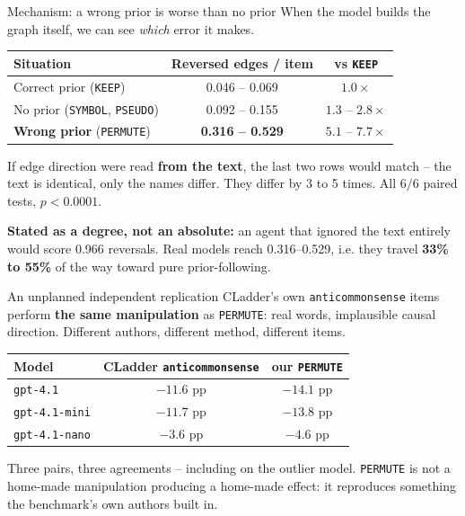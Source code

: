 \documentclass{beamer}
\begin{document}
\begin{frame}{Mechanism: a wrong prior is worse than no prior}
  When the model builds the graph itself, we can see \emph{which} error it makes.

  \begin{center}
  \small
  \begin{tabular}{lcc}
    \toprule
    Situation & Reversed edges / item & vs \texttt{KEEP} \\
    \midrule
    Correct prior (\texttt{KEEP})        & 0.046 -- 0.069 & $1.0\times$ \\
    No prior (\texttt{SYMBOL}, \texttt{PSEUDO}) & 0.092 -- 0.155 & $1.3$ -- $2.8\times$ \\
    \textbf{Wrong prior} (\texttt{PERMUTE}) & \textbf{0.316 -- 0.529} & $\mathbf{5.1}$ -- $\mathbf{7.7\times}$ \\
    \bottomrule
  \end{tabular}
  \end{center}

  \vspace{0.2cm}
  If edge direction were read \textbf{from the text}, the last two rows would
  match -- the text is identical, only the names differ. They differ by
  3 to 5 times. All $6/6$ paired tests, $p < 0.0001$.

  \vspace{0.2cm}
  \textbf{Stated as a degree, not an absolute:} an agent that ignored the text
  entirely would score 0.966 reversals. Real models reach 0.316--0.529, i.e.
  they travel \textbf{33\% to 55\%} of the way toward pure prior-following.
\end{frame}

\begin{frame}{An unplanned independent replication}
  CLadder's own \texttt{anticommonsense} items perform \textbf{the same
  manipulation} as \texttt{PERMUTE}: real words, implausible causal direction.
  Different authors, different method, different items.

  \begin{center}
  \begin{tabular}{lcc}
    \toprule
    Model & CLadder \texttt{anticommonsense} & our \texttt{PERMUTE} \\
    \midrule
    \texttt{gpt-4.1}      & $-11.6$ pp & $-14.1$ pp \\
    \texttt{gpt-4.1-mini} & $-11.7$ pp & $-13.8$ pp \\
    \texttt{gpt-4.1-nano} & $-3.6$ pp  & $-4.6$ pp \\
    \bottomrule
  \end{tabular}
  \end{center}

  \vspace{0.3cm}
  Three pairs, three agreements -- including on the outlier model.
  \texttt{PERMUTE} is not a home-made manipulation producing a home-made
  effect: it reproduces something the benchmark's own authors built in.
\end{frame}
\end{document}
